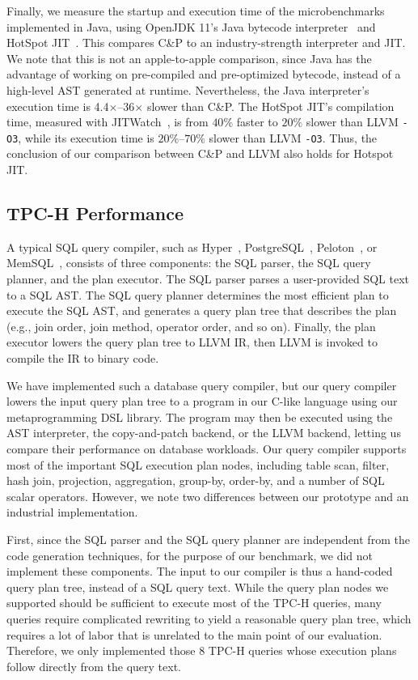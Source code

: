 \documentclass[acmsmall,nonacm,screen]{acmart}\settopmatter{printfolios=true,printccs=true,printacmref=false}
\newcommand{\llvm}{LLVM}
\newcommand{\othree}{\texttt{-O3}}
\newcommand{\cp}{copy-and-patch}
\newcommand{\cpshort}{C\&P}
\newcommand{\X}{$\times$}
\begin{document}
Finally, we measure the startup and execution time of the microbenchmarks implemented in Java, using OpenJDK 11's Java bytecode interpreter~\cite{java_bytecode_interpreter} and HotSpot JIT~\cite{java_hotspot_jit}. This compares \cpshort{} to an industry-strength interpreter and JIT. We note that this is not an apple-to-apple comparison, since Java has the advantage of working on pre-compiled and pre-optimized bytecode, instead of a high-level AST generated at runtime. Nevertheless, the Java interpreter's execution time is \num{4.4}\X{}--\num{36}\X{} slower than \cpshort{}. The HotSpot JIT's compilation time, measured with JITWatch~\cite{jitwatch_tool}, is from $40\%$ faster to $20\%$ slower than \llvm{} \othree{}, while its execution time is $20\%$--$70\%$ slower than \llvm{} \othree{}. Thus, the conclusion of our comparison between \cpshort{} and \llvm{} also holds for Hotspot JIT.


\subsection{TPC-H Performance}
\label{sec:database-benchmarks}

A typical SQL query compiler, such as Hyper~\cite{neumann2011}, PostgreSQL~\cite{postgresJit},  Peloton~\cite{pelotonQueryCompilation}, or MemSQL~\cite{memsqlCodegen}, consists of three components: the SQL parser, the SQL query planner, and the plan executor. The SQL parser parses a user-provided SQL text to a SQL AST. The SQL query planner determines the most efficient plan to execute the SQL AST, and generates a query plan tree that describes the plan (e.g., join order, join method, operator order, and so on). Finally, the plan executor lowers the query plan tree to LLVM IR, then LLVM is invoked to compile the IR to binary code. 

We have implemented such a database query compiler, but our query compiler lowers the input query plan tree to a program in our C-like language using our metaprogramming DSL library. The program may then be executed using the AST interpreter, the \cp{} backend, or the LLVM backend, letting us compare their performance on database workloads. Our query compiler supports most of the important SQL execution plan nodes, including table scan, filter, hash join, projection, aggregation, group-by, order-by, and a number of SQL scalar operators. However, we note two differences between our prototype and an industrial implementation. 

First, since the SQL parser and the SQL query planner are independent from the code generation techniques, for the purpose of our benchmark, we did not implement these components. The input to our compiler is thus a hand-coded query plan tree, instead of a SQL query text. While the query plan nodes we supported should be sufficient to execute most of the TPC-H queries, many queries require complicated rewriting to yield a reasonable query plan tree, which requires a lot of labor that is unrelated to the main point of our evaluation. Therefore, we only implemented those 8 TPC-H queries whose execution plans follow directly from the query text. 
\end{document}
